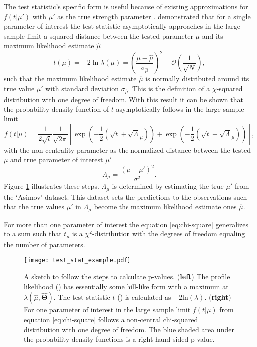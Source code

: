 The test statistic's specific form is useful because of existing approximations for $f(t | \mu')$ with $\mu'$ as the true strength parameter \citep{cowan2011asymptotic}.
\citet{wald1943tests} demonstrated that for a single parameter of interest the test statistic asymptotically approaches in the large sample limit a squared distance between the tested parameter $\mu$ and its maximum likelihood estimate $\hat{\mu}$
\begin{equation}
    t(\mu)=-2\ln \lambda(\mu)=
    \left(\frac{\mu-\hat{\mu}}{\sigma_{\hat{\mu}}} \right)^2
    + \mathcal{O}(\frac{1}{\sqrt{N}}),
\end{equation}
such that the maximum likelihood estimate $\hat{\mu}$ is normally distributed around its true value $\mu'$ with standard deviation $\sigma_{\hat{\mu}}$. This is the definition of a $\chi$-squared distribution with one degree of freedom. With this result it can be shown that \citep{cowan2011asymptotic} the probability density function of $t$ asymptotically follows in the large sample limit
\begin{equation}\label{eq:chi-square}
    f(t | \mu)=\frac{1}{2\sqrt{t}}\frac{1}{\sqrt{2\pi}}
    \left[
        \exp\left(-\frac{1}{2}\left(\sqrt{t}+\sqrt{\Lambda}_\mu\right)\right)
        +
        \exp\left(-\frac{1}{2}\left(\sqrt{t}-\sqrt{\Lambda}_\mu\right)\right)
        \right],
\end{equation}
with the non-centrality parameter as the normalized distance between the tested $\mu$ and true parameter of interest $\mu'$
\begin{equation}
    \Lambda_\mu=\frac{(\mu-\mu')^2}{\sigma^2}.
\end{equation}
Figure \ref{fig:test_stat_example} illustrates these steps. $\Lambda_\mu$ is determined by estimating the true $\mu'$ from the `Asimov' dataset. This dataset sets the predictions to the observations such that the true values $\mu'$ in $\Lambda_\mu$ become the maximum likelihood estimate ones $\hat{\mu}$.

For more than one parameter of interest the equation \ref{eq:chi-square} generalizes to a sum such that $t_\mu$ is a $\chi^2$-distribution with the degrees of freedom equaling the number of parameters.


\begin{figure}
    \centering
    \texttt{[image: test\_stat\_example.pdf]}
    \caption[]{A sketch to follow the steps to calculate p-values. (\textbf{left}) The profile likelihood ({\color[HTML]{1f77b4}{$\bm{\diagup}$}}) has essentially some hill-like form with a maximum at ${\lambda(\hat{\mu},\hat{\bm{\Theta}})}$. The test statistic $t$ ({\color[HTML]{ff7f0e}{$\bm{\diagup}$}}) is calculated as $-2\mathrm{ln}(\lambda)$. (\textbf{right}) For one parameter of interest in the large sample limit $f(t | \mu)$ from equation \ref{eq:chi-square} follows a non-central chi-squared distribution with one degree of freedom. The blue shaded area under the probability density functions is a right hand sided p-value.}
    \label{fig:test_stat_example}
\end{figure}

